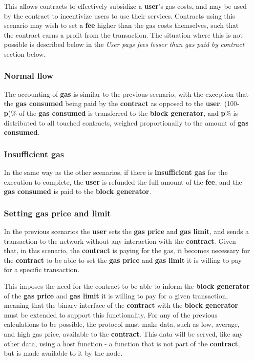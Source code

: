\documentclass[twocolumn, nofootinbib]{revtex4-2} %
\newcommand{\emphasize}[1]{\textbf{#1}\xspace}
\newcommand{\blockgenerator}{\emphasize{block generator}}
\newcommand{\contract}{\emphasize{contract}}
\newcommand{\fee}{\emphasize{fee}}
\newcommand{\gas}{\emphasize{gas}}
\newcommand{\gasprice}{\emphasize{gas price}}
\newcommand{\gaslimit}{\emphasize{gas limit}}
\newcommand{\gasconsumed}{\emphasize{gas consumed}}
\newcommand{\insufficientgas}{\emphasize{insufficient gas}}
\newcommand{\user}{\emphasize{user}}
\newcommand{\emphp}{\emphasize{p}}
\begin{document}
    This allows contracts to effectively subsidize a \user's gas costs, and may
    be used by the contract to incentivize users to use their services.
    Contracts using this scenario may wish to set a \fee higher than the gas
    costs themselves, such that the contract earns a profit from the transaction.
    The situation where this is not possible is described below in the
    \textit{User pays fees lesser than gas paid by contract} section below.

    \subsubsection*{Normal flow}\label{subsubsec:scenario-3-normal-flow}
    The accounting of \gas is similar to the previous scenario, with the exception
    that the \gasconsumed being paid by the \contract as opposed to the \user.
    (100-\emphp)\% of the \gasconsumed is transferred to the \blockgenerator, and
    \emphp\% is distributed to all touched contracts, weighed proportionally to the
    amount of \gasconsumed.

    \subsubsection*{Insufficient gas}\label{subsubsec:scenario-3-insufficient-gas}
    In the same way as the other scenarios, if there is \insufficientgas for the
    execution to complete, the \user is refunded the full amount of the \fee, and
    the \gasconsumed is paid to the \blockgenerator.

    \subsubsection*{Setting gas price and limit}\label{subsubsec:scenario-3-setting-gas-price-and-limit}
    In the previous scenarios the \user sets the \gasprice and \gaslimit, and
    sends a transaction to the network without any interaction with the \contract.
    Given that, in this scenario, the \contract is paying for the gas, it becomes
    necessary for the \contract to be able to set the \gasprice and \gaslimit it
    is willing to pay for a specific transaction.

    This imposes the need for the contract to be able to inform the \blockgenerator of
    the \gasprice and \gaslimit it is willing to pay for a given transaction,
    meaning that the binary interface of the \contract with the \blockgenerator
    must be extended to support this functionality.
    For any of the previous calculations to be possible, the protocol must make
    data, such as low, average, and high gas price, available to the \contract.
    This data will be served, like any other data, using a host function - a
    function that is not part of the \contract, but is made available to it
    by the node.
\end{document}

